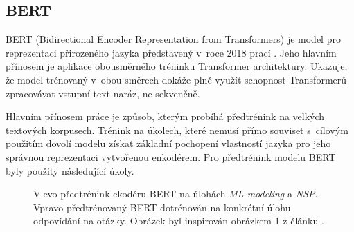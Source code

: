 \subsection{BERT}
BERT (Bidirectional Encoder Representation from Transformers) je model pro reprezentaci přirozeného jazyka představený v~roce 2018 prací \cite{BERT}. Jeho hlavním přínosem je aplikace obousměrného tréninku Transformer architektury. Ukazuje, že model trénovaný v~obou směrech dokáže plně využít schopnost Transformerů zpracovávat vstupní text naráz, ne sekvenčně.\par\smallskip
Hlavním přínosem práce \cite{BERT} je způsob, kterým probíhá předtrénink na velkých textových korpusech. Trénink na úkolech, které nemusí přímo souviset s~cílovým použitím dovolí modelu získat základní pochopení vlastností jazyka pro jeho správnou reprezentaci vytvořenou enkodérem. Pro předtrénink modelu BERT byly použity následující úkoly.

\begin{figure}[hbt]
	\centering
	\caption{Vlevo předtrénink ekodéru BERT na úlohách \emph{ML modeling} a \emph{NSP}. Vpravo předtrénovaný BERT dotrénován na konkrétní úlohu odpovídání na otázky. Obrázek byl inspirován obrázkem 1 z článku \cite{BERT}.}
	\label{bert}
\end{figure}

